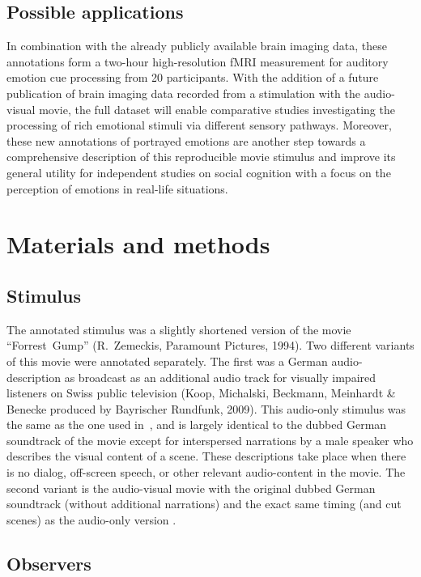 \documentclass[10pt,a4paper,twocolumn]{article}
\begin{document}
\subsection*{Possible applications}

In combination with the already publicly available brain imaging data, these
annotations form a two-hour high-resolution fMRI measurement for auditory
emotion cue processing from 20 participants. With the addition of a future
publication of brain imaging data recorded from a stimulation with the
audio-visual movie, the full dataset will enable comparative studies
investigating the processing of rich emotional stimuli via different sensory
pathways. Moreover, these new annotations of portrayed emotions are another
step towards a comprehensive description of this reproducible movie
stimulus\cite{HBI+14} and improve its general utility for independent studies
on social cognition with a focus on the perception of emotions in real-life
situations.


\section*{Materials and methods}

\subsection*{Stimulus}

The annotated stimulus was a slightly shortened version of the movie
``Forrest~Gump'' (R.~Zemeckis, Paramount Pictures, 1994). Two different
variants of this movie were annotated separately. The first was a German
audio-description as broadcast as an additional audio track for visually
impaired listeners on Swiss public television (Koop, Michalski, Beckmann,
Meinhardt \& Benecke produced by Bayrischer Rundfunk, 2009). This audio-only
stimulus was the same as the one used in~\cite{HBI+14}, and is largely
identical to the dubbed German soundtrack of the movie except for interspersed
narrations by a male speaker who describes the visual content of a scene. These
descriptions take place when there is no dialog, off-screen speech, or other
relevant audio-content in the movie. The second variant is the audio-visual
movie with the original dubbed German soundtrack (without additional
narrations) and the exact same timing (and cut scenes) as the audio-only
version \cite[contains instructions on how to reproduce the stimulus from the
DVD release]{HBI+14}.

\subsection*{Observers}
\end{document}
